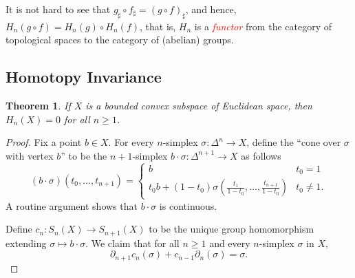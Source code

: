 \documentclass[10pt]{article}
\theoremstyle{thmstyle}
\newtheorem{theorem}{Theorem}[section]
\theoremstyle{defstyle}
\newcommand{\important}[1]{\textcolor{red}{\textit{#1}}}
\renewcommand{\ge}{\geqslant}
\begin{document}
It is not hard to see that $g_\sharp\circ f_\sharp = (g\circ f)_\sharp$, and hence, $H_n(g\circ f) = H_n(g)\circ H_n(f)$, that is, $H_n$ is a \important{functor} from the category of topological spaces to the category of (abelian) groups.

\subsection{Homotopy Invariance}

\begin{theorem}
    If $X$ is a bounded convex subspace of Euclidean space, then $H_n(X) = 0$ for all $n\ge 1$.
\end{theorem}
\begin{proof}
    Fix a point $b\in X$. For every $n$-simplex $\sigma:\Delta^n\to X$, define the ``cone over $\sigma$ with vertex $b$'' to be the $n + 1$-simplex $b\cdot\sigma:\Delta^{n + 1}\to X$ as follows 
    \begin{equation*}
        (b\cdot\sigma)(t_0,\dots, t_{n + 1}) = 
        \begin{cases}
            b & t_0 = 1\\
            t_0b + (1 - t_0)\sigma\left(\frac{t_1}{1 - t_0},\dots,\frac{t_{n + 1}}{1 - t_0}\right) & t_0\ne 1.
        \end{cases}
    \end{equation*}
    A routine argument shows that $b\cdot\sigma$ is continuous.

    Define $c_n: S_n(X)\to S_{n + 1}(X)$ to be the unique group homomorphism extending $\sigma\mapsto b\cdot\sigma$. We claim that for all $n\ge 1$ and every $n$-simplex $\sigma$ in $X$, 
    \begin{equation*}
        \partial_{n + 1}c_n(\sigma) + c_{n - 1}\partial_n(\sigma) = \sigma.
    \end{equation*}


\end{proof}
\end{document}
